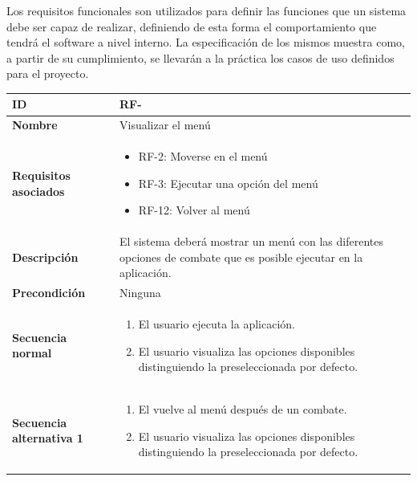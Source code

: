 Los requisitos funcionales son utilizados para definir las funciones que un sistema debe ser capaz de realizar, definiendo de esta forma el comportamiento que tendrá el software a nivel interno. La especificación de los mismos muestra como, a partir de su cumplimiento, se llevarán a la práctica los casos de uso definidos para el proyecto.


\setcounter{contador_requisitos_funcionales}{1}

\begin{center}
	\begin{tabular}{ | p{4.7cm} | p{10cm} | } 
		\hline
		
		\textbf{ID} & RF-\arabic{contador_requisitos_funcionales}
		{contador_requisitos_funcionales} \\
		
		\hline 
		\textbf{Nombre}&
		Visualizar el menú\\ 
		
		\hline
		\textbf{Requisitos asociados} & 
		\begin{itemize}
			\item RF-2: Moverse en el menú
			\item RF-3: Ejecutar una opción del menú
			\item RF-12: Volver al menú
		\end{itemize}\\
		
		\hline
		\textbf{Descripción} & 
		El sistema deberá mostrar un menú con las diferentes opciones de combate que es posible ejecutar en la aplicación.\\
		
		\hline
		\textbf{Precondición} & 
		Ninguna
		\\
		
		\hline
		\textbf{Secuencia normal} &
		\begin{enumerate}
			\item El usuario ejecuta la aplicación.
			\item El usuario visualiza las opciones disponibles distinguiendo la preseleccionada por defecto.
		\end{enumerate}
		\\
		
		\hline
		\textbf{Secuencia alternativa 1} &
		\begin{enumerate}
			\item El vuelve al menú después de un combate.
			\item El usuario visualiza las opciones disponibles distinguiendo la preseleccionada por defecto.
		\end{enumerate}
		\\
		

\end{tabular}
\end{center}
